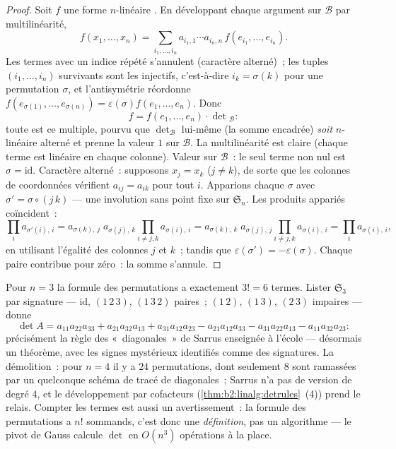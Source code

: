 \begin{proof}
Soit $f$ une forme $n$-linéaire . En développant chaque
argument sur $\mathcal{B}$ par multilinéarité,
\[
f(x_1, \dots, x_n)
= \sum_{i_1, \dots, i_n} a_{i_1,1}\cdots a_{i_n,n}\,
f(e_{i_1}, \dots, e_{i_n}).
\]
Les termes avec un indice répété s'annulent (caractère alterné)~; les
tuples $(i_1, \dots, i_n)$ survivants sont les injectifs, c'est-à-dire
$i_k = \sigma(k)$ pour une permutation $\sigma$, et l'antisymétrie
réordonne $f(e_{\sigma(1)}, \dots, e_{\sigma(n)}) = \varepsilon(\sigma)
f(e_1, \dots, e_n)$. Donc
\[
f = f(e_1, \dots, e_n) \cdot \det{}_{\mathcal{B}} :
\]
toute  est ce multiple, pourvu que
$\det_{\mathcal{B}}$ lui-même (la somme encadrée) \emph{soit}
$n$-linéaire alterné et prenne la valeur $1$ sur $\mathcal B$.
La multilinéarité est claire (chaque terme est linéaire en chaque
colonne). Valeur sur $\mathcal B$~: le seul terme non nul est $\sigma =
\mathrm{id}$. Caractère alterné~: supposons $x_j = x_k$ ($j \neq k$),
de sorte que les colonnes de coordonnées vérifient $a_{i j} = a_{i k}$
pour tout $i$. Apparions chaque $\sigma$ avec $\sigma' = \sigma\circ(j\,k)$
--- une involution sans point fixe sur $\mathfrak{S}_n$. Les
produits appariés coïncident~:
\[
\prod_i a_{\sigma'(i),\,i}
= a_{\sigma(k),\,j}\; a_{\sigma(j),\,k}
\prod_{i \neq j,k} a_{\sigma(i),\,i}
= a_{\sigma(k),\,k}\; a_{\sigma(j),\,j}
\prod_{i \neq j,k} a_{\sigma(i),\,i}
= \prod_i a_{\sigma(i),\,i},
\]
en utilisant l'égalité des colonnes $j$ et $k$~; tandis que
$\varepsilon(\sigma') = -\varepsilon(\sigma)$. Chaque paire
contribue pour zéro~: la somme s'annule.
\end{proof}

\begin{example}\label{ex:b2:linalg:sarrus}
Pour $n = 3$ la formule des permutations a exactement $3! = 6$ termes.
Lister $\mathfrak{S}_3$ par signature ---
$\mathrm{id}$, $(1\,2\,3)$, $(1\,3\,2)$ paires~;
$(1\,2)$, $(1\,3)$, $(2\,3)$ impaires --- donne
\[
\det A = a_{11}a_{22}a_{33} + a_{21}a_{32}a_{13} +
a_{31}a_{12}a_{23}
- a_{21}a_{12}a_{33} - a_{31}a_{22}a_{13} -
a_{11}a_{32}a_{23} :
\]
précisément la règle des «~diagonales~» de Sarrus enseignée à l'école
--- désormais un théorème, avec les signes mystérieux identifiés comme
des signatures. La démolition~: pour $n = 4$ il y a $24$
permutations, dont seulement $8$ sont ramassées par un quelconque
schéma de tracé de diagonales~; Sarrus n'a pas de version de degré
$4$, et le développement par cofacteurs (\cref{thm:b2:linalg:detrules}~(4))
prend le relais. Compter les termes est aussi un avertissement~: la
formule des permutations a $n!$ sommands, c'est donc une
\emph{définition}, pas un algorithme --- le pivot de Gauss calcule
$\det$ en $O(n^3)$ opérations à la place.
\end{example}

